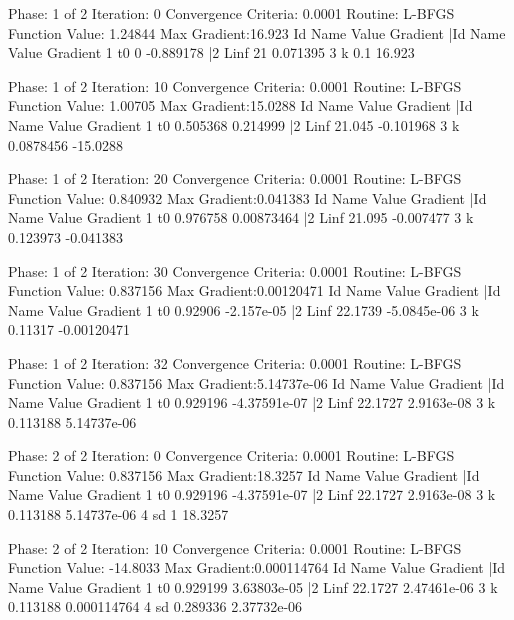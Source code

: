 \documentclass[12pt,a4paper]{article}
\begin{document}
\begin{myoutput}
Phase: 1 of 2
Iteration: 0
Convergence Criteria: 0.0001
Routine: L-BFGS
Function Value: 1.24844
Max Gradient:16.923
Id      Name      Value          Gradient       |Id      Name      Value          Gradient       
1       t0        0              -0.889178      |2       Linf      21             0.071395       
3       k         0.1            16.923         

Phase: 1 of 2
Iteration: 10
Convergence Criteria: 0.0001
Routine: L-BFGS
Function Value: 1.00705
Max Gradient:15.0288
Id      Name      Value          Gradient       |Id      Name      Value          Gradient       
1       t0        0.505368       0.214999       |2       Linf      21.045         -0.101968      
3       k         0.0878456      -15.0288       

Phase: 1 of 2
Iteration: 20
Convergence Criteria: 0.0001
Routine: L-BFGS
Function Value: 0.840932
Max Gradient:0.041383
Id      Name      Value          Gradient       |Id      Name      Value          Gradient       
1       t0        0.976758       0.00873464     |2       Linf      21.095         -0.007477      
3       k         0.123973       -0.041383      

Phase: 1 of 2
Iteration: 30
Convergence Criteria: 0.0001
Routine: L-BFGS
Function Value: 0.837156
Max Gradient:0.00120471
Id      Name      Value          Gradient       |Id      Name      Value          Gradient       
1       t0        0.92906        -2.157e-05     |2       Linf      22.1739        -5.0845e-06    
3       k         0.11317        -0.00120471    

Phase: 1 of 2
Iteration: 32
Convergence Criteria: 0.0001
Routine: L-BFGS
Function Value: 0.837156
Max Gradient:5.14737e-06
Id      Name      Value          Gradient       |Id      Name      Value          Gradient       
1       t0        0.929196       -4.37591e-07   |2       Linf      22.1727        2.9163e-08     
3       k         0.113188       5.14737e-06    

Phase: 2 of 2
Iteration: 0
Convergence Criteria: 0.0001
Routine: L-BFGS
Function Value: 0.837156
Max Gradient:18.3257
Id      Name      Value          Gradient       |Id      Name      Value          Gradient       
1       t0        0.929196       -4.37591e-07   |2       Linf      22.1727        2.9163e-08     
3       k         0.113188       5.14737e-06    4       sd        1              18.3257        

Phase: 2 of 2
Iteration: 10
Convergence Criteria: 0.0001
Routine: L-BFGS
Function Value: -14.8033
Max Gradient:0.000114764
Id      Name      Value          Gradient       |Id      Name      Value          Gradient       
1       t0        0.929199       3.63803e-05    |2       Linf      22.1727        2.47461e-06    
3       k         0.113188       0.000114764    4       sd        0.289336       2.37732e-06    


\end{myoutput}
\end{document}
